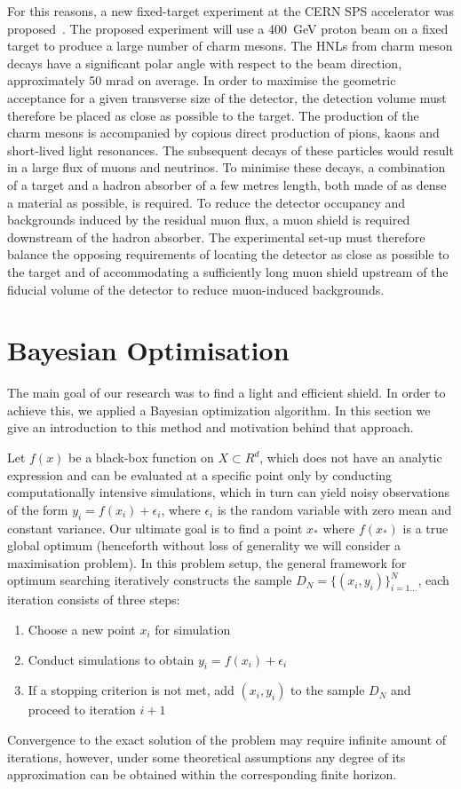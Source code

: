 \documentclass[a4paper]{jpconf}
\theoremstyle{my_theorem_style}
\numberwithin{equation}{section}
\begin{document}
For this reasons, a new fixed-target experiment at the CERN SPS accelerator was proposed~\cite{Bonivento:2013jag}. The proposed experiment will use a 400~GeV proton beam on a fixed target to produce a large number of charm mesons. The HNLs from charm meson decays have a significant polar angle with respect to the beam direction, approximately 50 mrad on average. In order to maximise the geometric
acceptance for a given transverse size of the detector, the detection volume must therefore be placed
as close as possible to the target. The production of the charm mesons is accompanied by copious direct production of pions, kaons and short-lived light resonances. The subsequent decays of these particles would result in a large flux of muons and neutrinos. To minimise these decays, a combination of a target and a hadron absorber of a few metres length, both made of as dense a material as possible, is required. To reduce the detector occupancy and backgrounds induced by the residual muon flux, a muon shield is required downstream of the hadron absorber. The experimental set-up must therefore balance the opposing requirements of locating the detector as close as possible to the target and of accommodating a sufficiently long muon shield upstream of the fiducial volume of the detector to reduce muon-induced backgrounds.

\section{Bayesian Optimisation}
The main goal of our research was to find a light and efficient shield. In order to achieve this, we applied a Bayesian optimization algorithm. In this section we give an introduction to this method and motivation behind that approach.

Let $f(x)$ be a black-box function on $X \subset R^d$, which does not have an analytic expression and can be evaluated at a specific point only by conducting computationally intensive simulations, which in turn can yield noisy observations of the form $y_i = f(x_i) + \epsilon_i$, where $\epsilon_i$ is the random variable with zero mean and constant variance. Our ultimate goal is to find a point $x_*$ where $f(x_*)$ is a true global optimum (henceforth without loss of generality we will consider a maximisation problem). In this problem setup, the general framework for optimum searching iteratively constructs the sample $D_N = \{(x_i, y_i)\}_{i=1…}^N$, each iteration consists of three steps:
\begin{enumerate}
\item \label{point_choosing} Choose a new point $x_{i}$ for simulation 
\item Conduct simulations to obtain $y_{i} = f(x_{i}) + \epsilon_i$
\item If a stopping criterion is not met, add $(x_{i}, y_{i})$ to the sample $D_N$ and proceed to iteration $i+1$
\end{enumerate}
Convergence to the exact solution of the problem may require infinite amount of iterations, however, under some theoretical assumptions any degree of its approximation can be obtained within the corresponding finite horizon.
\end{document}
